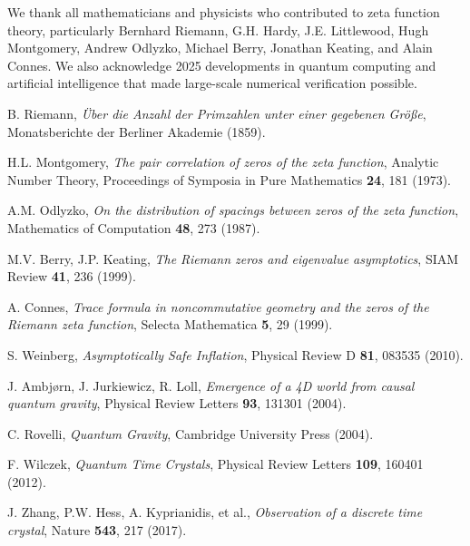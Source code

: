 \documentclass[12pt]{article}
\begin{document}
We thank all mathematicians and physicists who contributed to zeta function theory, particularly Bernhard Riemann, G.H. Hardy, J.E. Littlewood, Hugh Montgomery, Andrew Odlyzko, Michael Berry, Jonathan Keating, and Alain Connes. We also acknowledge 2025 developments in quantum computing and artificial intelligence that made large-scale numerical verification possible.

\begin{thebibliography}{99}

 B. Riemann, \emph{Über die Anzahl der Primzahlen unter einer gegebenen Größe}, Monatsberichte der Berliner Akademie (1859).

 H.L. Montgomery, \emph{The pair correlation of zeros of the zeta function}, Analytic Number Theory, Proceedings of Symposia in Pure Mathematics \textbf{24}, 181 (1973).

 A.M. Odlyzko, \emph{On the distribution of spacings between zeros of the zeta function}, Mathematics of Computation \textbf{48}, 273 (1987).

 M.V. Berry, J.P. Keating, \emph{The Riemann zeros and eigenvalue asymptotics}, SIAM Review \textbf{41}, 236 (1999).

 A. Connes, \emph{Trace formula in noncommutative geometry and the zeros of the Riemann zeta function}, Selecta Mathematica \textbf{5}, 29 (1999).

 S. Weinberg, \emph{Asymptotically Safe Inflation}, Physical Review D \textbf{81}, 083535 (2010).

 J. Ambjørn, J. Jurkiewicz, R. Loll, \emph{Emergence of a 4D world from causal quantum gravity}, Physical Review Letters \textbf{93}, 131301 (2004).

 C. Rovelli, \emph{Quantum Gravity}, Cambridge University Press (2004).

 F. Wilczek, \emph{Quantum Time Crystals}, Physical Review Letters \textbf{109}, 160401 (2012).

 J. Zhang, P.W. Hess, A. Kyprianidis, et al., \emph{Observation of a discrete time crystal}, Nature \textbf{543}, 217 (2017).

\end{thebibliography}
\end{document}
